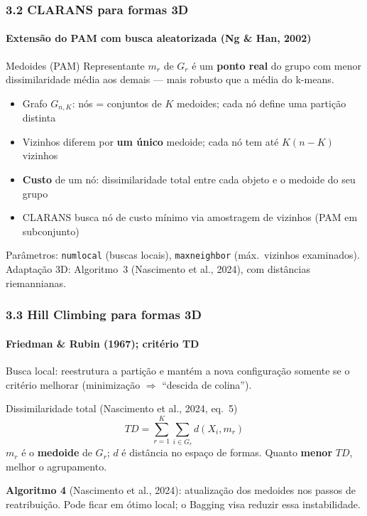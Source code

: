 \documentclass[brazilian,11pt]{beamer}
\begin{document}
\begin{frame}[shrink=5]
    \frametitle{3.2 CLARANS para formas 3D}
    \framesubtitle{Extensão do PAM com busca aleatorizada (Ng \& Han, 2002)}

    \begin{block}{Medoides (PAM)}
        Representante $m_r$ de $G_r$ é um \textbf{ponto real} do grupo com menor dissimilaridade média aos demais --- mais robusto que a média do k-means.
    \end{block}

    \begin{itemize}
        \item Grafo $G_{n,K}$: nós = conjuntos de $K$ medoides; cada nó define uma partição distinta
        \item Vizinhos diferem por \textbf{um único} medoide; cada nó tem até $K(n-K)$ vizinhos
        \item \textbf{Custo} de um nó: dissimilaridade total entre cada objeto e o medoide do seu grupo
        \item CLARANS busca nó de custo mínimo via amostragem de vizinhos (PAM em subconjunto)
    \end{itemize}

    Parâmetros: \texttt{numlocal} (buscas locais), \texttt{maxneighbor} (máx.\ vizinhos examinados). Adaptação 3D: Algoritmo~3 (Nascimento et al., 2024), com distâncias riemannianas.
\end{frame}

\begin{frame}[shrink=8]
    \frametitle{3.3 Hill Climbing para formas 3D}
    \framesubtitle{Friedman \& Rubin (1967); critério TD}

    \small
    Busca local: reestrutura a partição e mantém a nova configuração somente se o critério melhorar (minimização $\Rightarrow$ ``descida de colina'').

    \begin{block}{Dissimilaridade total (Nascimento et al., 2024, eq.~5)}
        \begin{equation}
            TD = \sum_{r=1}^{K} \sum_{i \in G_r} d(X_i, m_r)
        \end{equation}
        $m_r$ é o \textbf{medoide} de $G_r$; $d$ é distância no espaço de formas. Quanto \textbf{menor} $TD$, melhor o agrupamento.
    \end{block}

    \textbf{Algoritmo 4} (Nascimento et al., 2024): atualização dos medoides nos passos de reatribuição. Pode ficar em ótimo local; o Bagging visa reduzir essa instabilidade.
\end{frame}
\end{document}
